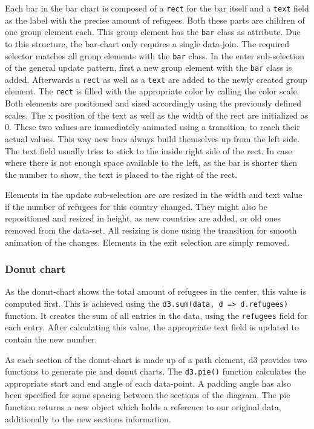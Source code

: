 Each bar in the bar chart is composed of a \texttt{rect} for the bar itself and a \texttt{text} field as the label with the precise amount of refugees. Both these parts are children of one group element each. This group element has the \texttt{bar} class as attribute. Due to this structure, the bar-chart only requires a single data-join. The required selector matches all group elements with the \texttt{bar} class. In the enter sub-selection of the general update pattern, first a new group element with the \texttt{bar} class is added. Afterwards a \texttt{rect} as well as a \texttt{text} are added to the newly created group element.  The \texttt{rect} is filled with the appropriate color by calling the color scale. Both elements are positioned and sized accordingly using the previously defined scales. The x position of the text as well as the width of the rect are initialized as 0. These two values are immediately animated using a transition, to reach their actual values. This way new bars always build themselves up from the left side. The text field usually tries to stick to the inside right side of the rect. In case where there is not enough space available to the left, as the bar is shorter then the number to show, the text is placed to the right of the rect.

Elements in the update sub-selection are are resized in the width and text value if the number of refugees for this country changed. They might also be repositioned and resized in height, as new countries are added, or old ones removed from the data-set. All resizing is done using the transition for smooth animation of the changes. Elements in the exit selection are simply removed.

\subsubsection{Donut chart}

As the donut-chart shows the total amount of refugees in the center, this value is computed first. This is achieved using the \texttt{d3.sum(data, d => d.refugees)} function. It creates the sum of all entries in the data, using the \texttt{refugees} field for each entry. After calculating this value, the appropriate text field is updated to contain the new number.

As each section of the donut-chart is made up of a path element, d3 provides two functions to generate pie and donut charts. The \texttt{d3.pie()} function calculates the appropriate start and end angle of each data-point. A padding angle has also been specified for some spacing between the sections of the diagram. The pie function returns a new object which holds a reference to our original data, additionally to the new sections information. 

